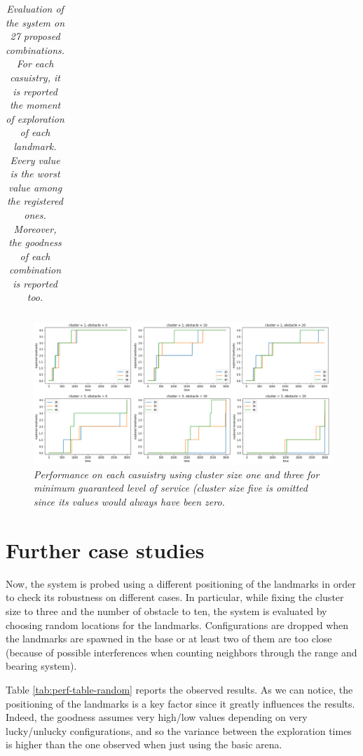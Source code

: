 \begin{table}[H]
\begin{tabular}{| c c c | c c c c | c |}
\end{tabular}
\caption{\label{tab:perf-table}\textit{Evaluation of the system on 27 proposed combinations. For each casuistry, it is reported the moment of exploration of each landmark. Every value is the worst value among the registered ones. Moreover, the goodness of each combination is reported too.}}
\end{table}

\begin{figure}[H]
\centering
\includegraphics[width=\linewidth]{images/ts_all.png}
\caption{\textit{Performance on each casuistry using cluster size one and three for minimum guaranteed level of service (cluster size five is omitted since its values would always have been zero.}}
\label{fig:ts-all}
\end{figure}

\section{Further case studies}

Now, the system is probed using a different positioning of the landmarks in order to check its robustness on different cases. In particular, while fixing the cluster size to three and the number of obstacle to ten, the system is evaluated by choosing random locations for the landmarks. Configurations are dropped when the landmarks are spawned in the base or at least two of them are too close (because of possible interferences when counting neighbors through the range and bearing system). 

\noindent
Table \ref{tab:perf-table-random} reports the observed results. As we can notice, the positioning of the landmarks is a key factor since it greatly influences the results. Indeed, the goodness assumes very high/low values depending on very lucky/unlucky configurations, and so the variance between the exploration times is higher than the one observed when just using the basic arena. 

